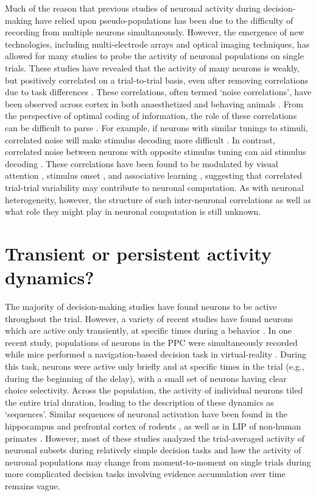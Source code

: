 \bigskip
Much of the reason that previous studies of neuronal activity during decision-making have relied upon pseudo-populations has been due to the difficulty of recording from multiple neurons simultaneously. However, the emergence of new technologies, including multi-electrode arrays and optical imaging techniques, has allowed for many studies to probe the activity of neuronal populations on single trials. These studies have revealed that the activity of many neurons is weakly, but positively correlated on a trial-to-trial basis, even after removing correlations due to task differences \citep{Zohary:1994ei}. These correlations, often termed ‘noise correlations’, have been observed across cortex in both anaesthetized and behaving animals \citep{Cohen:2011eh}. From the perspective of optimal coding of information, the role of these correlations can be difficult to parse \citep{Averbeck:2006ew}. For example, if neurons with similar tunings to stimuli, correlated noise will make stimulus decoding more difficult \citep{Zohary:1994ei}. In contrast, correlated noise between neurons with opposite stimulus tuning can aid stimulus decoding \citep{Romo:2003kd}. These correlations have been found to be modulated by visual attention \citep{Cohen:2009hw}, stimulus onset \citep{Churchland:2010he}, and associative learning \citep{Jeanne:2013bf}, suggesting that correlated trial-trial variability may contribute to neuronal computation. As with neuronal heterogeneity, however, the structure of such inter-neuronal correlations as well as what role they might play in neuronal computation is still unknown. 

\section{Transient or persistent activity dynamics?} \label{intro:trans_persistent}

The majority of decision-making studies have found neurons to be active throughout the trial. However, a variety of recent studies have found neurons which are active only transiently, at specific times during a behavior \citep{Harvey:2012du, Crowe:2010du, Pastalkova:2008hz, Fujisawa:2008dm}. In one recent study, populations of neurons in the PPC were simultaneously recorded while mice performed a navigation-based decision task in virtual-reality \citep{Harvey:2012du}. During this task, neurons were active only briefly and at specific times in the trial (e.g., during the beginning of the delay), with a small set of neurons having clear choice selectivity. Across the population, the activity of individual neurons tiled the entire trial duration, leading to the description of these dynamics as ‘sequences’. Similar sequences of neuronal activation have been found in the hippocampus \citep{Pastalkova:2008hz} and prefrontal cortex of rodents \citep{Fujisawa:2008dm}, as well as in LIP of non-human primates \citep{Crowe:2010du}. However, most of these studies analyzed the trial-averaged activity of neuronal subsets during relatively simple decision tasks and how the activity of neuronal populations may change from moment-to-moment on single trials during more complicated decision tasks involving evidence accumulation over time remains vague. 

